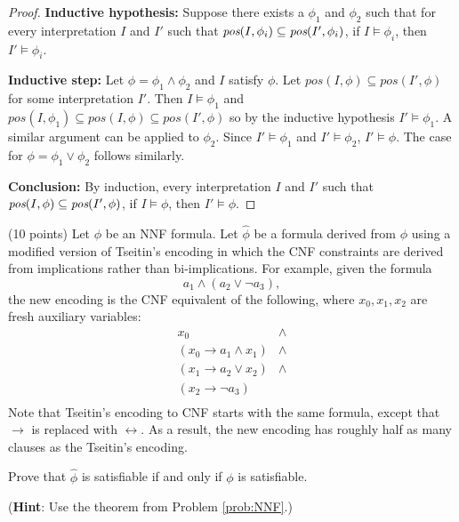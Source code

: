 \documentclass{article}
\newenvironment{solution}{\color{blue} \em }{}
\begin{document}
\begin{enumerate}
\begin{solution}
\begin{proof}
\item \textbf{Inductive hypothesis:} Suppose there exists a $\phi_1$ and $\phi_2$ such that for every interpretation $I$ and $I'$ such that $\emph{pos}(I, \phi_i) \subseteq \emph{pos}(I', \phi_i)$, if $I \models \phi_i$, then $I' \models \phi_i$.

\item \textbf{Inductive step:}
    Let $\phi = \phi_1 \land \phi_2$ and $I$ satisfy $\phi$. Let $pos(I, \phi) \subseteq pos(I', \phi)$ for some interpretation $I'$.  Then $I \models \phi_1$ and $pos(I, \phi_1) \subseteq pos(I, \phi) \subseteq pos(I', \phi)$ so by the inductive hypothesis $I' \models \phi_1$. A similar argument can be applied to $\phi_2$. Since $I' \models \phi_1$ and $I' \models \phi_2$, $I' \models \phi$.
The case for $\phi = \phi_1 \lor \phi_2$ follows similarly.

\item \textbf{Conclusion:} By induction, every interpretation $I$ and $I'$ such that $\emph{pos}(I, \phi) \subseteq \emph{pos}(I', \phi)$, if $I \models \phi$, then $I' \models \phi$.


\end{proof}
\end{solution}



\item (10 points) Let $\phi$ be an NNF formula.  Let $\hat{\phi}$ be a formula derived from $\phi$ using a modified version of Tseitin's encoding in which the CNF constraints are derived from implications rather than bi-implications.   For example, given the formula
\[a_1\land (a_2 \lor \neg a_3),\]
the new encoding is the CNF equivalent of the following, where $x_0, x_1, x_2$ are fresh auxiliary variables:
\[
\begin{array}{ll}
x_0 & \land \\
(x_0 \rightarrow a_1 \land x_1) & \land \\
(x_1 \rightarrow a_2 \lor x_2) & \land \\
(x_2 \rightarrow \neg a_3) &  \\
\end{array}
\]
Note that Tseitin's encoding to CNF starts with the same formula, except that $\rightarrow$ is replaced with $\leftrightarrow$.  As a result, the new encoding has roughly half as many clauses as the Tseitin's encoding.

\medskip
Prove that $\hat{\phi}$ is satisfiable if and only if $\phi$ is satisfiable.

\medskip
(\textbf{Hint}: Use the theorem from Problem \ref{prob:NNF}.)


\end{enumerate}
\end{document}
